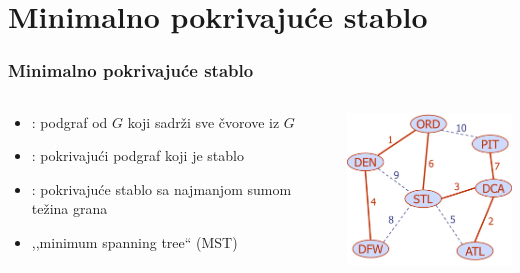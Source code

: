 \documentclass[compress,aspectratio=169]{beamer}
\begin{document}
\section[Minimalno pokrivajuće stablo]{Minimalno pokrivajuće stablo}

\begin{frame}[fragile]
  \frametitle{Minimalno pokrivajuće stablo}
  \begin{columns}
    \begin{column}[t]{7cm}
      \begin{itemize}
        \item {}: podgraf od $G$ koji sadrži 
          sve čvorove iz $G$
        \item {}: pokrivajući podgraf koji je
          stablo
        \item {}: pokrivajuće stablo
          sa najmanjom sumom težina grana
        \item ,,minimum spanning tree`` (MST)
      \end{itemize}
    \end{column}
    \begin{column}[t]{5cm}
      \begin{center}
        \includegraphics[width=5cm]{asp-14-pic68.png}
      \end{center}
    \end{column}
  \end{columns}
\end{frame}
\end{document}
